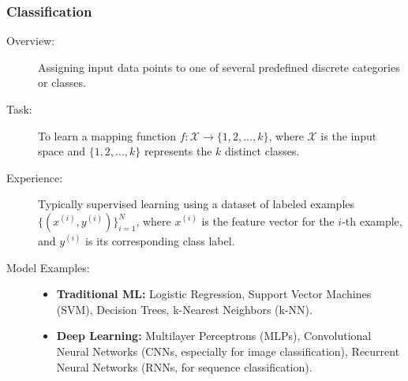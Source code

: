 \documentclass{article}
\begin{document}
\subsubsection{Classification}
\begin{description}
    \item[Overview:] Assigning input data points to one of several predefined discrete categories or classes.
    \item[Task:] To learn a mapping function $f: \mathcal{X} \rightarrow \{1, 2, ..., k\}$, where $\mathcal{X}$ is the input space and $\{1, 2, ..., k\}$ represents the $k$ distinct classes.
    \item[Experience:] Typically supervised learning using a dataset of labeled examples $\{(x^{(i)}, y^{(i)})\}_{i=1}^N$, where $x^{(i)}$ is the feature vector for the $i$-th example, and $y^{(i)}$ is its corresponding class label.
    \item[Model Examples:]
        \begin{itemize}
            \item \textbf{Traditional ML:} Logistic Regression, Support Vector Machines (SVM), Decision Trees, k-Nearest Neighbors (k-NN).
            \item \textbf{Deep Learning:} Multilayer Perceptrons (MLPs), Convolutional Neural Networks (CNNs, especially for image classification), Recurrent Neural Networks (RNNs, for sequence classification).
        \end{itemize}
\end{description}
\end{document}
